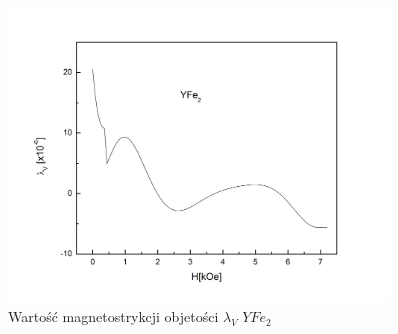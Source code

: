 \documentclass[a4paper,12pt]{article}
\numberwithin{equation}{section}
\begin{document}
\begin{figure}[h]
    \centering
    \includegraphics[width =0.9\textwidth]{../img/magneto/YObjetosc}
    \caption{Wartość magnetostrykcji objetości $\lambda_{V}$ $YFe_2$}
    \label{YObjetosc}
\end{figure}




\end{document}

